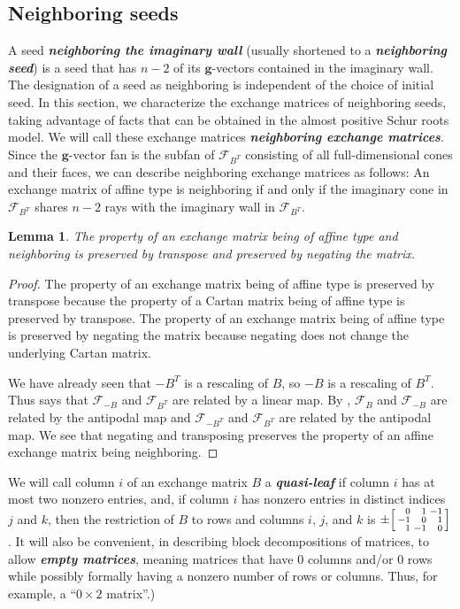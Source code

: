 \documentclass{amsart}
\newtheorem{lemma}[proposition]{Lemma}
\theoremstyle{definition}
\theoremstyle{remark}
\numberwithin{equation}{section}
\newcommand{\newword}[1]{\textbf{\emph{#1}}}
\newcommand{\F}{{\mathcal F}}
\newcommand{\0}{{\mathbf{0}}}
\newcommand{\g}{\mathbf{g}}
\begin{document}
\subsection{Neighboring seeds}
A seed \newword{neighboring the imaginary wall} (usually shortened to a \newword{neighboring seed}) is a seed that has $n-2$ of its $\g$-vectors contained in the imaginary wall.
The designation of a seed as neighboring is independent of the choice of initial seed.
In this section, we characterize the exchange matrices of neighboring seeds, taking advantage of facts that can be obtained in the almost positive Schur roots model.
We will call these exchange matrices \newword{neighboring exchange matrices}.
Since the $\g$-vector fan is the subfan of $\F_{B^T}$ consisting of all full-dimensional cones and their faces, we can describe neighboring exchange matrices as follows:
An exchange matrix of affine type is neighboring if and only if the imaginary cone in $\F_{B^T}$ shares $n-2$ rays with the imaginary wall in $\F_{B^T}$.

\begin{lemma}\label{neigh neg and T}
The property of an exchange matrix being of affine type and neighboring is preserved by transpose and preserved by negating the matrix.
\end{lemma}
\begin{proof}
The property of an exchange matrix being of affine type is preserved by transpose because the property of a Cartan matrix being of affine type is preserved by transpose.
The property of an exchange matrix being of affine type is preserved by negating the matrix because negating does not change the underlying Cartan matrix.

We have already seen that $-B^T$ is a rescaling of $B$, so $-B$ is a rescaling of $B^T$.
Thus \cite[Proposition~7.8(3)]{universal} says that $\F_{-B}$ and $\F_{B^T}$ are related by a linear map.
By \cite[Proposition~7.1]{universal}, $\F_B$ and $\F_{-B}$ are related by the antipodal map and $\F_{-B^T}$ and $\F_{B^T}$ are related by the antipodal map.
We see that negating and transposing preserves the property of an affine exchange matrix being neighboring.
\end{proof}

We will call column $i$ of an exchange matrix $B$ a \newword{quasi-leaf} if column $i$ has at most two nonzero entries, and, if column $i$ has nonzero entries in distinct indices $j$ and $k$, then the restriction of $B$ to rows and columns $i$, $j$, and $k$ is $\pm\begin{bsmallmatrix*}[r]0&1&-1\\-1&0&1\\1&-1&0\end{bsmallmatrix*}$.
It will also be convenient, in describing block decompositions of matrices, to allow \newword{empty matrices}, meaning matrices that have $0$ columns and/or $0$ rows while possibly formally having a nonzero number of rows or columns.
Thus, for example, a ``$0\times 2$ matrix''.)
\end{document}
